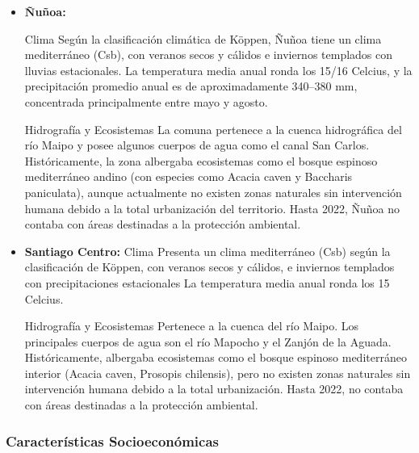 \begin{itemize}
    \item \textbf{Ñuñoa:}
    
    Clima
Según la clasificación climática de Köppen, Ñuñoa tiene un clima mediterráneo (Csb), con veranos secos y cálidos e inviernos templados con lluvias estacionales. La temperatura media anual ronda los 15/16 Celcius, y la precipitación promedio anual es de aproximadamente 340–380 mm, concentrada principalmente entre mayo y agosto.

Hidrografía y Ecosistemas
La comuna pertenece a la cuenca hidrográfica del río Maipo y posee algunos cuerpos de agua como el canal San Carlos. Históricamente, la zona albergaba ecosistemas como el bosque espinoso mediterráneo andino (con especies como Acacia caven y Baccharis paniculata), aunque actualmente no existen zonas naturales sin intervención humana debido a la total urbanización del territorio. Hasta 2022, Ñuñoa no contaba con áreas destinadas a la protección ambiental.

    \item \textbf{Santiago Centro:}
    Clima
Presenta un clima mediterráneo (Csb) según la clasificación de Köppen, con veranos secos y cálidos, e inviernos templados con precipitaciones estacionales La temperatura media anual ronda los 15 Celcius.

Hidrografía y Ecosistemas
Pertenece a la cuenca del río Maipo. Los principales cuerpos de agua son el río Mapocho y el Zanjón de la Aguada. Históricamente, albergaba ecosistemas como el bosque espinoso mediterráneo interior (Acacia caven, Prosopis chilensis), pero no existen zonas naturales sin intervención humana debido a la total urbanización. Hasta 2022, no contaba con áreas destinadas a la protección ambiental.
    
\end{itemize}
    
\subsubsection{Características Socioeconómicas}

